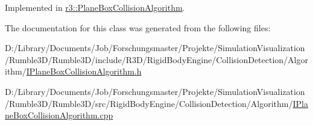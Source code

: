 Implemented in \mbox{\hyperlink{classr3_1_1_plane_box_collision_algorithm_a529c85973e9dab38e7427cdf9177d9ba}{r3\+::\+Plane\+Box\+Collision\+Algorithm}}.



The documentation for this class was generated from the following files\+:\begin{DoxyCompactItemize}
\item 
D\+:/\+Library/\+Documents/\+Job/\+Forschungsmaster/\+Projekte/\+Simulation\+Visualization/\+Rumble3\+D/\+Rumble3\+D/include/\+R3\+D/\+Rigid\+Body\+Engine/\+Collision\+Detection/\+Algorithm/\mbox{\hyperlink{_i_plane_box_collision_algorithm_8h}{I\+Plane\+Box\+Collision\+Algorithm.\+h}}\item 
D\+:/\+Library/\+Documents/\+Job/\+Forschungsmaster/\+Projekte/\+Simulation\+Visualization/\+Rumble3\+D/\+Rumble3\+D/src/\+Rigid\+Body\+Engine/\+Collision\+Detection/\+Algorithm/\mbox{\hyperlink{_i_plane_box_collision_algorithm_8cpp}{I\+Plane\+Box\+Collision\+Algorithm.\+cpp}}\end{DoxyCompactItemize}
